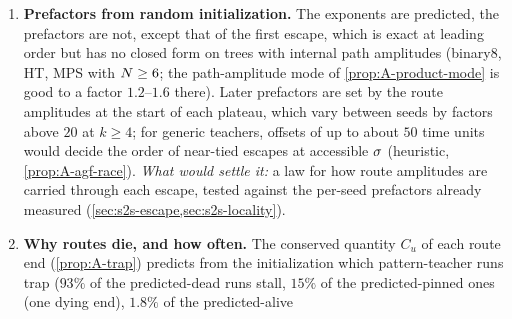 \begin{enumerate}[label=\arabic*.,leftmargin=*,itemsep=4pt]
    escape law was checked on one teacher only (MPS6), from the saddle and from small initialization; the
    forgetting was seen there from small initialization, and in 6 of the 7 HT4 runs that learn the smaller
    component first (order $6$, not $k=7$). Also open: the borderline case in which the largest eigenvalue of the
    generalized piggyback operator equals $\tw j$ ($k^*\ge4$); \cref{thm:A-order-sharp} without its index
    condition, or for signed and non-pattern residuals; the length of the plateau after the forgetting; and
    an exponent near $4$ in about half of the control seeds of the same check, where the route predicts $3$.
    Long routes are only partly measured: $k=6,7$ over one decade, with balanced initialization only, on
    binary8 and HT4; MPS8 with $k=6$ gives $4.51\pm0.19$ against $4$; $k=8$ was not measured; and at $k=4$
    a second negative Hessian eigenvalue of the route's order appears on the plateau, so for $k\ge5$ such
    directions might change how $\lambda_{\min}$ scales with $\isc$ (\cref{prop:A-signatures}).
    \emph{What would settle it:} pre-registered per-seed fits of the escape time from the saddle plus a
    perturbation of size $\varepsilon$ (predicted $\propto\varepsilon^{-(\text{order}-2)}$) on every case
    with order below $k^*$ and on controls, and balanced runs over more than a decade for $k\ge6$, with
    plateau Hessians.
  \item \textbf{Prefactors from random initialization.} The exponents are predicted, the prefactors are
    not, except that of the first escape, which is exact at leading order but has no closed form on trees
    with internal path amplitudes (binary8, HT, MPS with $N\ge6$; the path-amplitude mode of
    \cref{prop:A-product-mode} is good to a factor $1.2$--$1.6$ there). Later prefactors are set by the
    route amplitudes at the start of each plateau, which vary between seeds by factors above $20$ at
    $k\ge4$; for generic teachers, offsets of up to about $50$ time units would decide the order of
    near-tied escapes at accessible $\isc$ \conjecture{} (heuristic, \cref{prop:A-agf-race}). \emph{What
    would settle it:} a law for how route amplitudes are carried through each escape, tested against the
    per-seed prefactors already measured (\cref{sec:s2s-escape,sec:s2s-locality}).
  \item \textbf{Why routes die, and how often.} The conserved quantity $C_u$ of each route end
    (\cref{prop:A-trap}) predicts from the initialization which pattern-teacher runs trap ($93\%$ of the
    predicted-dead runs stall, $15\%$ of the predicted-pinned ones (one dying end), $1.8\%$ of the predicted-alive

\end{enumerate}

